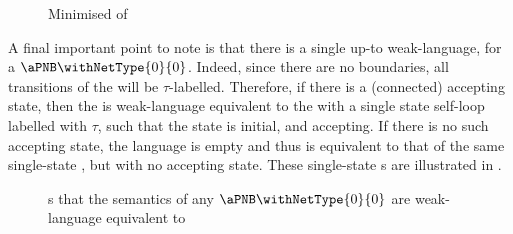 \begin{figure}[ht]
    \centering
    \caption{Minimised \TNFA{} of }
    \label{fig:examplePNBTNFAMinimised}
\end{figure}

A final important point to note is that there is a single \TNFA{} up-to
weak-language, for a $\aPNB \withNetType{0}{0}$. Indeed, since there are no
boundaries, all transitions of the \TNFA{} will be $\tau$-labelled. Therefore,
if there is a (connected) accepting state, then the \TNFA{} is weak-language
equivalent to the \TNFA{} with a single state self-loop labelled with $\tau$,
such that the state is initial, and accepting. If there is no such accepting
state, the language is empty and thus is equivalent to that of the same
single-state \TNFA{}, but with no accepting state. These single-state \TNFA{}s
are illustrated in .

\begin{figure}[ht]
    \centering
    \begin{subfigure}{0.5\textwidth}
        \centering
    \end{subfigure}%
    \begin{subfigure}{0.5\textwidth}
        \centering
    \end{subfigure}%
    \caption{\TNFA{}s that the semantics of any $\aPNB \withNetType{0}{0}$ are
    weak-language equivalent to}
    \label{fig:00TNFAs}
\end{figure}

